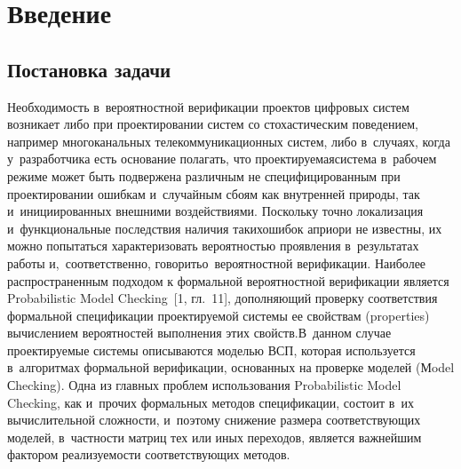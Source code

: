 \begin{multicols}{2}

\label{st\stat}


\section{Введение}

\subsection{Постановка задачи}


Необходимость в~вероятностной верификации проектов цифровых систем
возникает либо при проектировании систем со стохастическим
поведением, например многоканальных телекоммуникационных систем,
либо в~случаях,  когда у~разработ\-чика есть основание полагать, что
проектируемая\linebreak система в~рабочем режиме может быть подвержена
различным не специфицированным при проектировании ошибкам
и~случайным сбоям как внутрен\-ней природы, так и~инициированных
внешними воздействиями. Поскольку точно локализация и~функциональные
последствия наличия таких\linebreak ошибок априори не известны, их можно
попытаться характеризовать вероятностью проявления в~результатах
работы и,~соответственно, говорить\linebreak о~вероятностной верификации.
Наиболее распространенным подходом к формальной вероятностной
верификации является Probabilistic Model Checking~[1,
гл.~11], дополняющий проверку соот\-ветствия формальной спецификации
про\-ек\-ти\-ру\-емой системы ее свойствам (properties) вычис\-ле\-нием
вероятностей выполнения этих свойств.\linebreak В~данном случае проектируемые
системы описываются моделью ВСП, которая
используется в~алгоритмах формальной верификации, основанных на
проверке моделей (Мodel Сhecking). Одна из главных проблем
использования Probabilistic Model Checking, как и~прочих формальных
методов спецификации, состоит в~их вычислительной сложности,
и~поэтому снижение размера соответствующих моделей, в~частности матриц
тех или иных переходов, является важнейшим фактором реализуемости
соответствующих методов.


\end{multicols}

